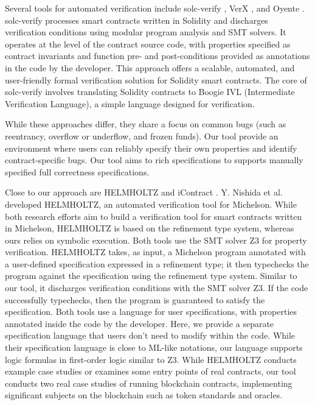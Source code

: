 \documentclass[a4paper,USenglish,cleveref, autoref, thm-restate]{lipics-v2021}
\begin{document}
Several tools for automated verification include solc-verify \cite{solc}, VerX \cite{verx}, and Oyente \cite{oyente}. solc-verify processes smart contracts written in Solidity and discharges verification conditions using modular program analysis and SMT solvers. It operates at the level of the contract source code, with properties specified as contract invariants and function pre- and post-conditions provided as annotations in the code by the developer. This approach offers a scalable, automated, and user-friendly formal verification solution for Solidity smart contracts. The core of solc-verify involves translating Solidity contracts to Boogie IVL (Intermediate Verification Language), a simple language designed for verification. 

While these approaches differ, they share a focus on common bugs (such as reentrancy, overflow or underflow, and frozen funds). Our tool provide an environment where users can reliably specify their own properties and identify contract-specific bugs. Our tool aims to rich specifications to supports manually specified full correctness specifications.


Close to our approach are HELMHOLTZ \cite{helmholtz} and iContract \cite{icontract}. Y. Nishida et al. \cite{helmholtz} developed HELMHOLTZ, an automated verification tool for Michelson. While both research efforts aim to build a verification tool for smart contracts written in Michelson, HELMHOLTZ is based on the refinement type system, whereas ours relies on symbolic execution. Both tools use the SMT solver Z3 for property verification. HELMHOLTZ takes, as input, a Michelson program annotated with a user-defined specification expressed in a refinement type; it then typechecks the program against the specification using the refinement type system. Similar to our tool, it discharges verification conditions with the SMT solver Z3. If the code successfully typechecks, then the program is guaranteed to satisfy the specification. Both tools use a language for user specifications, with properties annotated inside the code by the developer. Here, we provide a separate specification language that users don't need to modify within the code. While their specification language is close to ML-like notations, our language supports logic formulas in first-order logic similar to Z3. While HELMHOLTZ conducts example case studies or examines some entry points of real contracts, our tool conducts two real case studies of running blockchain contracts, implementing significant subjects on the blockchain such as token standards and oracles.
\end{document}
